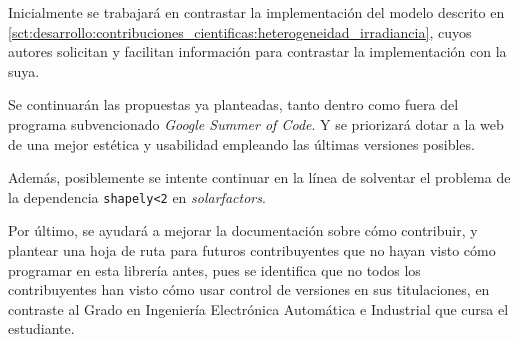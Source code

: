 Inicialmente se trabajará en contrastar la implementación del modelo descrito en \ref{sct:desarrollo:contribuciones_cientificas:heterogeneidad_irradiancia}, cuyos autores solicitan y facilitan información para contrastar la implementación con la suya.

Se continuarán las propuestas ya planteadas, tanto dentro como fuera del programa subvencionado \textit{Google Summer of Code}. Y se priorizará dotar a la web de una mejor estética y usabilidad empleando las últimas versiones posibles.

Además, posiblemente se intente continuar en la línea de solventar el problema de la dependencia \texttt{shapely<2} en \textit{solarfactors}.

Por último, se ayudará a mejorar la documentación sobre cómo contribuir, y plantear una hoja de ruta para futuros contribuyentes que no hayan visto cómo programar en esta librería antes, pues se identifica que no todos los contribuyentes han visto cómo usar control de versiones en sus titulaciones, en contraste al Grado en Ingeniería Electrónica Automática e Industrial que cursa el estudiante.
